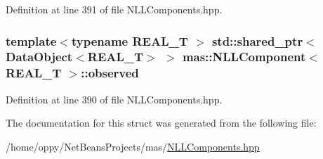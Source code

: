 Definition at line 391 of file N\-L\-L\-Components.\-hpp.

\hypertarget{structmas_1_1_n_l_l_component_a82a2b4e08e4b1f9509aae06b0622bcef}{
\subsubsection[{observed}]{\setlength{\rightskip}{0pt plus 5cm}template$<$typename R\-E\-A\-L\-\_\-\-T $>$ std\-::shared\-\_\-ptr$<${\bf Data\-Object}$<$R\-E\-A\-L\-\_\-\-T$>$ $>$ {\bf mas\-::\-N\-L\-L\-Component}$<$ R\-E\-A\-L\-\_\-\-T $>$\-::observed}}\label{structmas_1_1_n_l_l_component_a82a2b4e08e4b1f9509aae06b0622bcef}


Definition at line 390 of file N\-L\-L\-Components.\-hpp.



The documentation for this struct was generated from the following file\-:\begin{DoxyCompactItemize}
\item 
/home/oppy/\-Net\-Beans\-Projects/mas/\hyperlink{_n_l_l_components_8hpp}{N\-L\-L\-Components.\-hpp}\end{DoxyCompactItemize}
